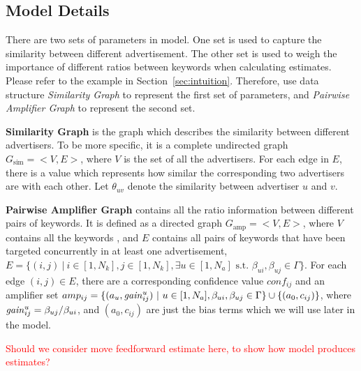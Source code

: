 \subsection{Model Details}
\label{sec:details}


There are two sets of parameters in {\sppan} model. One set is used to
capture the similarity between different advertisement. The other set
is used to weigh the importance of different ratios between keywords
when calculating estimates. Please refer to the example in
Section~\ref{sec:intuition}. Therefore, use data structure {\it
  Similarity Graph} to represent the first set of parameters, and {\it
  Pairwise Amplifier Graph} to represent the second set.

{\bf Similarity Graph} is the graph which describes the similarity
between different advertisers. To be more specific, it is a complete
undirected graph $G_{\mbox{sim}}=<V,E>$, where $V$ is the set of all
the advertisers. For each edge in $E$, there is a value which
represents how similar the corresponding two advertisers are with each
other. Let $\theta_{uv}$ denote the similarity between advertiser
$u$ and $v$.

{\bf Pairwise Amplifier Graph} contains all the ratio information
between different pairs of keywords. It is defined as a directed graph
$G_{\mbox{amp}}=<V,E>$, where $V$ contains all the keywords , and $E$
contains all pairs of keywords that have been targeted concurrently in
at least one advertisement, $E=\{(i,j)~|~ i\in [1,N_k],j \in
[1,N_k],\exists u\in [1,N_a]\mbox{ s.t. }\beta_{ui},\beta_{uj}\in
\Gamma\}$. For each edge $(i,j)\in E$, there are a corresponding
confidence value $conf_{ij}$ and an amplifier set
$amp_{ij}=\{(a_u,\mathit{gain}^{u}_{ij})~|~u\in [1,N_a],\beta_{ui},\beta_{uj}\in
\Gamma\} \cup \{(a_0,c_{ij})\}$, where
$\mathit{gain}^{u}_{ij}=\beta_{uj}/\beta_{ui}$, and $(a_0,c_{ij})$ are just the
bias terms which we will use later in the model.

\textcolor{red}{Should we consider move feedforward estimate here, to
  show how model produces estimates?}
